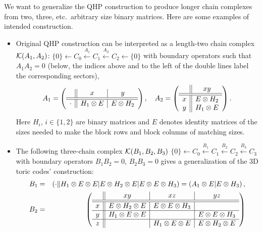 \documentclass[aps,prb,12pt,tightenlines,%
notitlepage,longbibliography]{revtex4-1}
\begin{document}
We  want to generalize the QHP construction\cite{Tillich-Zemor-2009} to
produce longer chain complexes from two, three, etc.\ arbitrary size
binary matrices.  Here are some examples of intended construction.
\begin{itemize}
\item Original QHP construction can be interpreted as a length-two
  chain complex $ {\cal K}(A_1,A_2)$:
  $\{0\}\leftarrow C_0\stackrel{A_1}\leftarrow C_1\stackrel{A_2}\leftarrow
  C_2\leftarrow \{0\}$ with boundary operators such that $A_1A_2=0$
  (below, the indices above and to the left of the double lines label
  the corresponding sectors),
  \begin{equation}
A_1=\left(
  \begin{array}[c]{c||c|c}
& x & y\\ \hline\hline 
\cdot & H_1\otimes E & E\otimes H_2
  \end{array}
\right), \quad A_2=
\left(
  \begin{array}[c]{c||c}
   &  xy \\ \hline\hline 
x&    E\otimes H_2\\
y&    H_1\otimes E
  \end{array}
\right).\label{eq:two-chain-complex-QHP}
\end{equation}
Here $H_i$, $i\in \{1,2\}$ are binary matrices and $E$ denotes
identity matrices of the sizes needed to make the block rows and block
columns of matching sizes.
\item The following three-chain complex ${\cal K}(B_1,B_2,B_3)$
  $\{0\}\leftarrow C_0\stackrel{B_1}\leftarrow C_1\stackrel{B_2}\leftarrow
  C_2\stackrel{B_3}\leftarrow C_3$ with boundary operators
  $B_1B_2=0$, $B_2B_3=0$ gives a generalization of the 3D toric codes'
  construction:
  \begin{eqnarray*}
    B_1&=&\left(\cdot \| H_1\otimes E\otimes E|E\otimes H_2\otimes E|E\otimes
           E\otimes H_3\right)=
           \left(A_1\otimes E|E\otimes H_3\right),\\
    B_2&=&\left(
           \begin{array}[c]{c||c|c|c}
             & xy & xz & yz \\ \hline\hline 
             x& 
                E\otimes H_2\otimes E  & E\otimes E\otimes H_3 &  \\ \hline 
             y&   H_1\otimes E\otimes E& & E\otimes E\otimes H_3 \\  \hline 
             z&  &  H_1\otimes E\otimes E& E\otimes H_2\otimes E
           \end{array}\right)

\end{eqnarray*}
\end{itemize}
\end{document}
